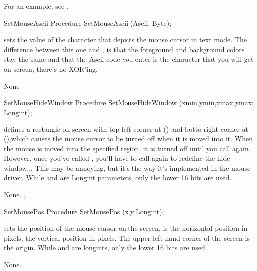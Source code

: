 For an example, see .
\begin{procedure}{SetMouseAscii}
\Declaration
Procedure SetMouseAscii (Ascii: Byte);

\Description

sets the  value of the character that depicts the mouse cursor in 
text mode.
The difference between this one and , is that the foreground
and background colors stay the same and that the Ascii code you enter is the
character that you will get on screen; there's no XOR'ing.

\Errors
None
\SeeAlso
{}
\end{procedure}
\latex{}
\html{}
\begin{procedure}{SetMouseHideWindow}
\Declaration
Procedure SetMouseHideWindow (xmin,ymin,xmax,ymax: Longint);

\Description

defines a rectangle on screen with top-left corner at () and
botto-right corner at (),which causes the mouse cursor to be 
turned off when it is moved into it.
When the mouse is moved into the specified region, it is turned off until you
call  again. However, once you've called , you'll have to
call  again to redefine the hide window... 
This may be annoying, but it's the way it's implemented in the mouse driver.
While  and  are Longint parameters, 
only the lower 16 bits are used.

\Errors
None.
\SeeAlso
{}, 
\end{procedure}
\html{}
\begin{procedure}{SetMousePos}
\Declaration
Procedure SetMousePos (x,y:Longint);

\Description

 sets the position of the mouse cursor on the screen.
 is the horizontal position in pixels,  the vertical position
in pixels. The upper-left hand corner of the screen is the origin.
While  and  are longints, only the lower 16 bits are used.

\Errors
None.
\SeeAlso
{}
\end{procedure}
\latex{}
\html{}
